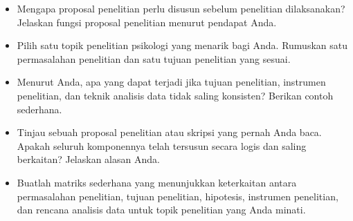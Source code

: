 \documentclass[
  indonesian,
  letterpaper,
  DIV=11,
  numbers=noendperiod]{scrreprt}
\providecommand{\tightlist}{%
  \setlength{\itemsep}{0pt}\setlength{\parskip}{0pt}}
\begin{document}
\begin{tcolorbox}[enhanced jigsaw, colframe=quarto-callout-important-color-frame, toptitle=1mm, breakable, leftrule=.75mm, arc=.35mm, toprule=.15mm, colback=white, colbacktitle=quarto-callout-important-color!10!white, bottomtitle=1mm, bottomrule=.15mm, titlerule=0mm, title=\textcolor{quarto-callout-important-color}{\faExclamation}\hspace{0.5em}{Refleksi \& Diskusi}, coltitle=black, left=2mm, opacitybacktitle=0.6, opacityback=0, rightrule=.15mm]

\begin{itemize}
\tightlist
\item
  Mengapa proposal penelitian perlu disusun sebelum penelitian
  dilaksanakan? Jelaskan fungsi proposal penelitian menurut pendapat
  Anda.
\item
  Pilih satu topik penelitian psikologi yang menarik bagi Anda. Rumuskan
  satu permasalahan penelitian dan satu tujuan penelitian yang sesuai.
\item
  Menurut Anda, apa yang dapat terjadi jika tujuan penelitian, instrumen
  penelitian, dan teknik analisis data tidak saling konsisten? Berikan
  contoh sederhana.
\item
  Tinjau sebuah proposal penelitian atau skripsi yang pernah Anda baca.
  Apakah seluruh komponennya telah tersusun secara logis dan saling
  berkaitan? Jelaskan alasan Anda.
\item
  Buatlah matriks sederhana yang menunjukkan keterkaitan antara
  permasalahan penelitian, tujuan penelitian, hipotesis, instrumen
  penelitian, dan rencana analisis data untuk topik penelitian yang Anda
  minati.
\end{itemize}

\end{tcolorbox}
\end{document}
